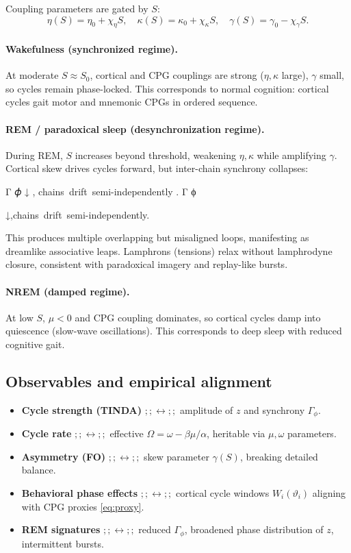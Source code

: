 \documentclass{article}
\begin{document}
Coupling parameters are gated by $S$:
\begin{equation}
\eta(S) = \eta_0 + \chi_\eta S,\quad
\kappa(S) = \kappa_0 + \chi_\kappa S,\quad
\gamma(S) = \gamma_0 - \chi_\gamma S.
\label{eq:Scoupling}
\end{equation}

\paragraph{Wakefulness (synchronized regime).}
At moderate $S\approx S_0$, cortical and CPG couplings are strong
($\eta,\kappa$ large), $\gamma$ small, so cycles remain phase-locked.
This corresponds to normal cognition: cortical cycles gait motor and mnemonic CPGs in ordered sequence.

\paragraph{REM / paradoxical sleep (desynchronization regime).}
During REM, $S$ increases beyond threshold, weakening $\eta,\kappa$ while amplifying $\gamma$.
Cortical skew drives cycles forward, but inter-chain synchrony collapses:

Γ
𝜙
↓
,
chains drift semi-independently
.
Γ
ϕ
	​

↓,chains drift semi-independently.

This produces multiple overlapping but misaligned loops, manifesting as dreamlike associative leaps.
Lamphrons (tensions) relax without lamphrodyne closure, consistent with paradoxical imagery and replay-like bursts.

\paragraph{NREM (damped regime).}
At low $S$, $\mu<0$ and CPG coupling dominates, so cortical cycles damp into quiescence (slow-wave oscillations).
This corresponds to deep sleep with reduced cognitive gait.

\subsection{Observables and empirical alignment}

\begin{itemize}
\item \textbf{Cycle strength (TINDA)} $;;\leftrightarrow;;$ amplitude of $z$ and synchrony $\Gamma_\phi$.
\item \textbf{Cycle rate} $;;\leftrightarrow;;$ effective $\Omega=\omega-\beta\mu/\alpha$, heritable via $\mu,\omega$ parameters.
\item \textbf{Asymmetry (FO)} $;;\leftrightarrow;;$ skew parameter $\gamma(S)$, breaking detailed balance.
\item \textbf{Behavioral phase effects} $;;\leftrightarrow;;$ cortical cycle windows $W_i(\vartheta_i)$ aligning with CPG proxies \eqref{eq:proxy}.
\item \textbf{REM signatures} $;;\leftrightarrow;;$ reduced $\Gamma_\phi$, broadened phase distribution of $z$, intermittent bursts.
\end{itemize}
\end{document}
